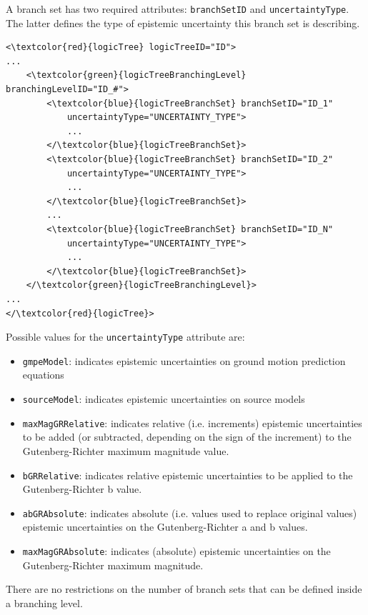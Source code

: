 A branch set has two required attributes: \Verb+branchSetID+ and 
\Verb+uncertaintyType+. The latter defines the type of epistemic uncertainty 
this branch set is describing.
\begin{Verbatim}[frame=single, commandchars=\\\{\}]
<\textcolor{red}{logicTree} logicTreeID="ID">
...
	<\textcolor{green}{logicTreeBranchingLevel} branchingLevelID="ID_#">
		<\textcolor{blue}{logicTreeBranchSet} branchSetID="ID_1"
			uncertaintyType="UNCERTAINTY_TYPE">
			...
		</\textcolor{blue}{logicTreeBranchSet}>
		<\textcolor{blue}{logicTreeBranchSet} branchSetID="ID_2"
			uncertaintyType="UNCERTAINTY_TYPE">
			...
		</\textcolor{blue}{logicTreeBranchSet}>
		...
		<\textcolor{blue}{logicTreeBranchSet} branchSetID="ID_N"
			uncertaintyType="UNCERTAINTY_TYPE">
			...
		</\textcolor{blue}{logicTreeBranchSet}>
	</\textcolor{green}{logicTreeBranchingLevel}>
...
</\textcolor{red}{logicTree}>
\end{Verbatim}
Possible values for the \Verb+uncertaintyType+ attribute are:
\label{list_epistemic_unc}
\begin{itemize}
\item \Verb+gmpeModel+: indicates epistemic uncertainties on ground 
motion prediction equations
\item \Verb+sourceModel+: indicates epistemic uncertainties on source models
\item \Verb+maxMagGRRelative+: indicates relative (i.e. increments)
	epistemic uncertainties to be added (or subtracted, depending on 
	the sign of the increment) to the Guten\-berg-Richter maximum 
	magnitude value.
\item \Verb+bGRRelative+: indicates relative epistemic uncertainties 
	to be applied to the Guten\-berg-Richter b value.
\item \Verb+abGRAbsolute+: indicates absolute (i.e. values used to replace
 	original values) epistemic uncertainties on the 
	Guten\-berg-Richter a and b values.
\item \Verb+maxMagGRAbsolute+: indicates (absolute) epistemic 
	uncertainties on the Guten\-berg-Richter maximum magnitude.
\end{itemize}
There are no restrictions on the number of branch sets that can be defined 
inside a branching level.

